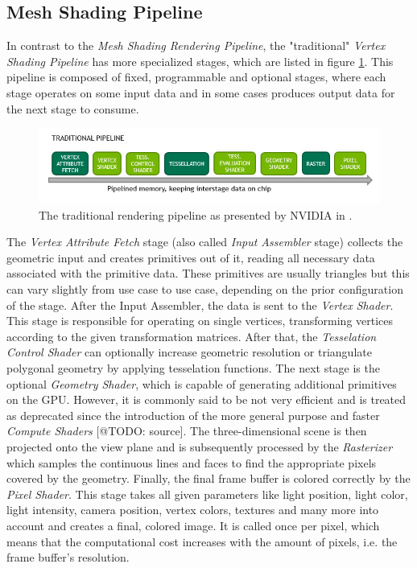 \subsection*{Mesh Shading Pipeline} \label{subsec-the-mesh-shading-pipeline}

In contrast to the \emph{Mesh Shading Rendering Pipeline}, the "traditional" \emph{Vertex Shading Pipeline} 
has more specialized stages, which are listed in figure \ref{fig:traditional-rendering-pipeline}. This pipeline 
is composed of fixed, programmable and optional stages, where each stage operates on some input data and in 
some cases produces output data for the next stage to consume.\\

\begin{figure}[h]
    \centering
    \includegraphics[width=\linewidth]{images/graphics/traditional-rendering-pipeline.jpg}
    \caption{The traditional rendering pipeline as presented by NVIDIA in \cite{Kubisch2018}.}
    \label{fig:traditional-rendering-pipeline}
\end{figure}

\noindent
The \emph{Vertex Attribute Fetch} stage (also called \emph{Input Assembler} stage) collects the geometric 
input and creates primitives out of it, reading all necessary data associated with the primitive data. 
These primitives are usually triangles but this can vary slightly from use case to use case, depending
on the prior configuration of the stage. After the Input Assembler, the data is sent to the \emph{Vertex Shader}.
This stage is responsible for operating on single vertices, transforming vertices according to the given 
transformation matrices. After that, the \emph{Tesselation Control Shader} can optionally increase geometric 
resolution or triangulate polygonal geometry by applying tesselation functions. The next stage is the optional 
\emph{Geometry Shader}, which is capable of generating additional primitives on the \ac{GPU}. However, it is 
commonly said to be not very efficient and is treated as deprecated since the introduction of the more general 
purpose and faster \emph{Compute Shaders} [@TODO: source]. The three-dimensional scene is then projected onto the 
view plane and is subsequently processed by the \emph{Rasterizer} which samples the continuous lines and faces to 
find the appropriate pixels covered by the geometry. Finally, the final frame buffer is colored correctly by the 
\emph{Pixel Shader}. This stage takes all given parameters like light position, light color, light intensity, camera 
position, vertex colors, textures and many more into account and creates a final, colored image. It is called once 
per pixel, which means that the computational cost increases with the amount of pixels, i.e. the frame buffer's 
resolution. 

